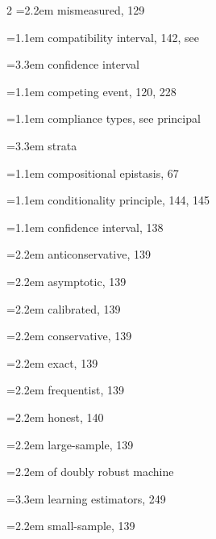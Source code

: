 \begin{multicols}{2}
\hspace*{1.1em}\hangindent=2.2em mismeasured, 129\par
\hangindent=1.1em compatibility interval, 142, see\par
\hspace*{2.2em}\hangindent=3.3em confidence interval\par
\hangindent=1.1em competing event, 120, 228\par
\hangindent=1.1em compliance types, see principal\par
\hspace*{2.2em}\hangindent=3.3em strata\par
\hangindent=1.1em compositional epistasis, 67\par
\hangindent=1.1em conditionality principle, 144, 145\par
\hangindent=1.1em confidence interval, 138\par
\hspace*{1.1em}\hangindent=2.2em anticonservative, 139\par
\hspace*{1.1em}\hangindent=2.2em asymptotic, 139\par
\hspace*{1.1em}\hangindent=2.2em calibrated, 139\par
\hspace*{1.1em}\hangindent=2.2em conservative, 139\par
\hspace*{1.1em}\hangindent=2.2em exact, 139\par
\hspace*{1.1em}\hangindent=2.2em frequentist, 139\par
\hspace*{1.1em}\hangindent=2.2em honest, 140\par
\hspace*{1.1em}\hangindent=2.2em large-sample, 139\par
\hspace*{1.1em}\hangindent=2.2em of doubly robust machine\par
\hspace*{2.2em}\hangindent=3.3em learning estimators, 249\par
\hspace*{1.1em}\hangindent=2.2em small-sample, 139\par

\end{multicols}
